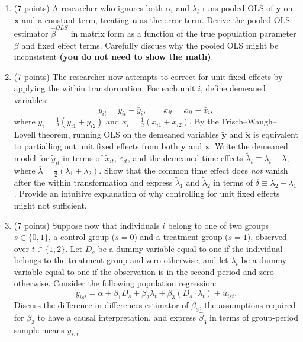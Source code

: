\documentclass[letterpaper,12pt]{article}
\theoremstyle{dotlessS}
\begin{document}
\begin{enumerate}[label=(\alph*)]

\item (7 points) A researcher who ignores both $\alpha_i$ and $\lambda_t$ runs pooled OLS of $\bm{y}$ on $\bm{x}$ and a constant term, treating $\bm{u}$ as the error term. Derive the pooled OLS estimator $\hat{\beta}^{OLS}$ in matrix form as a function of the true population parameter $\beta$ and fixed effect terms. Carefully discuss why the pooled OLS might be inconsistent \textbf{(you do not need to show the math)}.
\item (7 points) The researcher now attempts to correct for unit fixed effects by applying the within transformation. For each unit $i$, define demeaned variables:
\begin{equation*}
    \tilde{y}_{it} = y_{it} - \bar{y}_i, \qquad \tilde{x}_{it} = x_{it} - \bar{x}_i,
\end{equation*}
where $\bar{y}_i = \frac{1}{2}(y_{i1}+y_{i2})$ and $\bar{x}_i = \frac{1}{2}(x_{i1}+x_{i2})$. By the Frisch--Waugh--Lovell theorem, running OLS on the demeaned variables $\tilde{\bm{y}}$ and $\tilde{\bm{x}}$ is equivalent to partialling out unit fixed effects from both $\bm{y}$ and $\bm{x}$. Write the demeaned model for $\tilde{y}_{it}$ in terms of $\tilde{x}_{it}$, $\tilde{\varepsilon}_{it}$, and the demeaned time effects $\tilde{\lambda}_t \equiv \lambda_t - \bar{\lambda}$, where $\bar{\lambda}=\frac{1}{2}(\lambda_1+\lambda_2)$. Show that the common time effect does \emph{not} vanish after the within transformation and express $\tilde{\lambda}_1$ and $\tilde{\lambda}_2$ in terms of $\delta \equiv \lambda_2 - \lambda_1$.  Provide an intuitive explanation of why controlling for unit fixed effects might not sufficient.



\item (7 points) Suppose now that individuals $i$ belong to one of two groups $s \in \{0,1\}$, a control group ($s=0$) and a treatment group ($s=1$), observed over $t \in \{1,2\}$. Let $D_s$ be a dummy variable equal to one if the individual belongs to the treatment group and zero otherwise, and let $\lambda_t$ be a dummy variable equal to one if the observation is in the second period and zero otherwise. Consider the following population regression:
\begin{equation*}
    y_{ist} = \alpha + \beta_1 D_s + \beta_2 \lambda_t + \beta_3 \left(D_s \cdot \lambda_t\right) + u_{ist}.
\end{equation*}
Discuss the difference-in-differences estimator of $\beta_3$, the assumptions required for $\beta_3$ to have a causal interpretation, and express $\hat{\beta}_3$ in terms of group-period sample means $\bar{y}_{s,t}$.

\end{enumerate}
\end{document}
